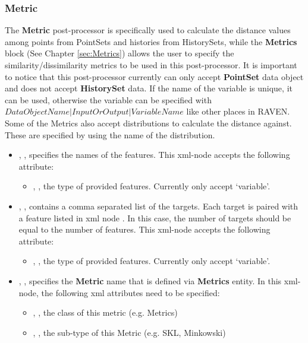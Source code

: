 \subsubsection{Metric}
\label{MetricPP}
The \textbf{Metric} post-processor is specifically used to calculate the distance values among points from PointSets and histories from HistorySets,
while the \textbf{Metrics} block (See Chapter \ref{sec:Metrics}) allows the user to specify the similarity/dissimilarity metrics to be used in this
post-processor. It is important to notice that this post-processor currently can only accept \textbf{PointSet} data
object and does not accept \textbf{HistorySet} data.  If the name of the variable is unique, it can be used,
otherwise the variable can be specified with $DataObjectName|InputOrOutput|VariableName$ like other places in RAVEN.
Some of the Metrics also accept distributions to calculate the distance against.  These are specified by using the name of the distribution.
%
%
\begin{itemize}
  \item {}, , specifies the names of the features.
    This xml-node accepts the following attribute:
    \begin{itemize}
      \item {}, , the type of provided features. Currently only
        accept `variable'.
    \end{itemize}
  \item {}, , contains a comma separated list of
    the targets. \nb Each target is paired with a feature listed in xml node . In this case, the
    number of targets should be equal to the number of features.
    This xml-node accepts the following attribute:
    \begin{itemize}
      \item {}, , the type of provided features. Currently only
        accept `variable'.
    \end{itemize}
  \item {}, , specifies the \textbf{Metric} name that is defined via
    \textbf{Metrics} entity. In this xml-node, the following xml attributes need to be specified:
    \begin{itemize}
      \item {}, , the class of this metric (e.g. Metrics)
      \item {}, , the sub-type of this Metric (e.g. SKL, Minkowski)
    \end{itemize}
\end{itemize}

